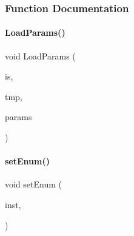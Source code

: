 \subsubsection{Function Documentation}
\mbox{\label{_inventory_8h_a027b287b99619c750f30b4765ec929e5}} 
\paragraph{\texorpdfstring{LoadParams()}{LoadParams()}}
{\footnotesize\ttfamily void Load\+Params (\begin{DoxyParamCaption}\item[{std\+::istream \&}]{is,  }\item[{\mbox{\hyperlink{struct_temp_input}{Temp\+Input}} \&}]{tmp,  }\item[{int const}]{params }\end{DoxyParamCaption})}

\mbox{\label{_inventory_8h_aa9bc06c48979e6ec21d5fe16ca9b8164}} 
\paragraph{\texorpdfstring{setEnum()}{setEnum()}}
{\footnotesize\ttfamily void set\+Enum (\begin{DoxyParamCaption}\item[{\mbox{\hyperlink{class_string}{String}}}]{inst,  }\item[{enum \mbox{\hyperlink{_inventory_8h_abddff37837f171d72a2e16a1448a3943}{enum\+Part}} \&}]{ }\end{DoxyParamCaption})}

